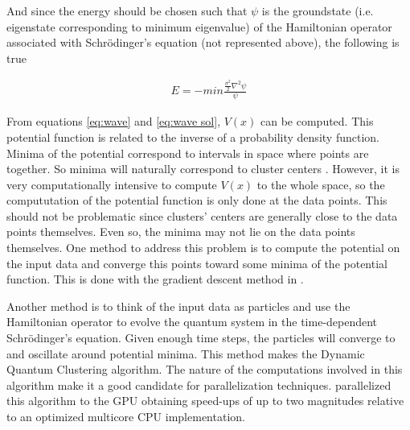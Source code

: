 And since the energy should be chosen such that $\psi$ is the groundstate (i.e. eigenstate corresponding to minimum eigenvalue) of the Hamiltonian operator associated with Schrödinger's equation (not represented above), the following is true

\begin{align}
E = - min \frac {\frac{\sigma^2}{2}\nabla^2 \psi }{\psi}
\label{eq:wave sol}
\end{align}

From equations \ref{eq:wave} and \ref{eq:wave sol}, $V(x)$ can be computed.
This potential function is related to the inverse of a probability density function.
Minima of the potential correspond to intervals in space where points are together.
So minima will naturally correspond to cluster centers \cite{Horn2001a}.
However, it is very computationally intensive to compute $V(x)$ to the whole space, so the compututation of the potential function is only done at the data points.
This should not be problematic since clusters' centers are generally close to the data points themselves. 
Even so, the minima may not lie on the data points themselves.
One method to address this problem is to compute the potential on the input data and converge this points toward some minima of the potential function.
This is done with the gradient descent method in \cite{Horn2001a}. 

Another method \cite{Weinstein2009} is to think of the input data as particles and use the Hamiltonian operator to evolve the quantum system in the time-dependent Schrödinger's equation.
Given enough time steps, the particles will converge to and oscillate around potential minima.
This method makes the Dynamic Quantum Clustering algorithm.
The nature of the computations involved in this algorithm make it a good candidate for parallelization techniques.
\citet{Wittek2013} parallelized this algorithm to the GPU obtaining speed-ups of up to two magnitudes relative to an optimized multicore CPU implementation. %


%


